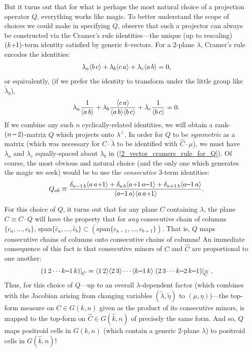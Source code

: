 \documentclass[12pt,hyperref,compress]{JHEP3}
\renewcommand{\hat}{\widehat}
\newcommand{\eq}[1]{\begin{equation}#1\end{equation}}
\newcommand{\mi}{{\rm\rule[2.4pt]{6pt}{0.65pt}}}
\newcommand{\pl}{\hspace{0.5pt}\text{{\small+}}\hspace{-0.5pt}}
\newcommand{\ab}[1]{\langle #1 \rangle}
\begin{document}
{But it turns out that for what is perhaps the most natural choice of a projection operator $Q$, everything works like magic. To better understand the scope of choices we could make in specifying $Q$, observe that such a projector can always be constructed via the Cramer's rule identities---the unique (up to rescaling) $(k\pl1)$-term identity satisfied by generic $k$-vectors. For a $2$-plane $\lambda$, Cramer's rule encodes the identities:
\vspace{-.3cm}\eq{\lambda_a\ab{b\,c}+\lambda_b\ab{c\,a}+\lambda_c\ab{a\,b}=0,\vspace{-.3cm}}
or equivalently, (if we prefer the identity to transform under the little group like $\widetilde\lambda_b$),
\vspace{-.4cm}\eq{\lambda_a\frac{1}{\ab{a\,b}}+\lambda_b\frac{\ab{c\,a}}{\ab{a\,b}\ab{b\,c}}+\lambda_c\frac{1}{\ab{b\,c}}=0.\vspace{-.1cm}\label{2_vector_cramers_rule_for_Q}}
If we combine any such $n$ cyclically-related identities, we will obtain a rank-$(n\,\mi\,2)$-matrix $Q$ which projects onto $\lambda^\perp$. In order for $Q$ to be {\it symmetric} as a matrix (which was necessary for $C\!\cdot\!\widetilde\lambda$ to be identified with $\hat{C}\!\cdot\!\mu$), we must have $\lambda_a$ and $\lambda_c$ equally-spaced about $\lambda_b$ in (\ref{2_vector_cramers_rule_for_Q}). Of course, the most obvious and natural choice (and the only one which generates the magic we seek) would be to use the {\it consecutive} 3-term identities:
\vspace{-.2cm}\eq{Q_{ab}\equiv\frac{\delta_{a-1\,b}\ab{a\,a\pl1}+\delta_{a\,b}\ab{a\pl1\,a\mi1}+\delta_{a+1\,b}\ab{a\mi1\,a}}{\ab{a\mi1\,a}\ab{a\,a\pl1}}.\vspace{-.2cm}\label{definition_of_Q}}

For this choice of $Q$, it turns out that for any plane $C$ containing $\lambda$, the plane $\hat{C}\equiv C\!\cdot\!Q$ will have the property that for {\it any} consecutive chain of columns \mbox{$\{c_a,\ldots,c_b\}$}, \mbox{$\mathrm{span}\{\hat{c}_a,\ldots,\hat{c}_b\}\subset(\mathrm{span}\{c_{a-1},\ldots,c_{b+1}\})$}. That is, $Q$ maps consecutive chains of columns onto consecutive chains of columns! An immediate consequence of this fact is that consecutive minors of $C$ and $\hat{C}$ are proportional to one another:
\vspace{-0.2cm}\eq{\left.(1\,2\cdots k\mi1\,k)\right|_{C}=\ab{1\,2}\ab{2\,3}\cdots\ab{k\mi1\,k}\left.(2\,3\cdots k\mi2\,k\mi1)\right|_{\hat{C}}\,.\vspace{-.2cm}\label{proportionality_of_cyclic_minors}}
Thus, for this choice of $Q$---up to an overall $\lambda$-dependent factor (which combines with the Jacobian arising from changing variables $(\widetilde\lambda,\widetilde\eta)$ to $(\mu,\eta)$)---the top-form measure on $C\!\in\!G(k,n)$ given as the product of its consecutive minors, is mapped to the top-form on $\hat{C}\!\in\!G(\hat{k},n)$ of precisely the same form. And so, $Q$ maps positroid cells in $G(k,n)$  (which contain a generic $2$-plane $\lambda$) to positroid cells in $G(\hat{k},n)$!


}
\end{document}
